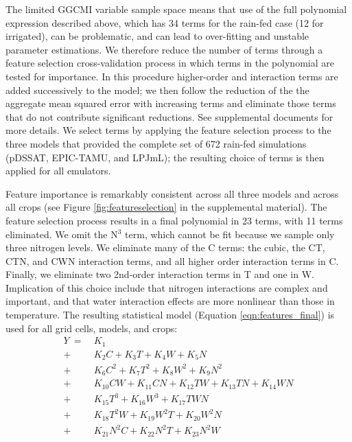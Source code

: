 \documentclass[preprint, 5p, times, twocolumn]{elsarticle}
\begin{document}
The limited GGCMI variable sample space means that use of the full polynomial expression described above, which has 34 terms for the rain-fed case (12 for irrigated), can be problematic, and can lead to over-fitting and unstable parameter estimations. We therefore reduce the number of terms through a feature selection cross-validation process in which terms in the polynomial are tested for importance. In this procedure higher-order and interaction terms are added successively to the model; we then follow the reduction of the the aggregate mean squared error with increasing terms and eliminate those terms that do not contribute significant reductions. See supplemental documents for more details. We select terms by applying the feature selection process to the three models that provided the complete set of 672 rain-fed simulations (pDSSAT, EPIC-TAMU, and LPJmL); the resulting choice of terms is then applied for all emulators. 

Feature importance is remarkably consistent across all three models and across all crops (see Figure \ref{fig:featureselection} in the supplemental material). The feature selection process results in a final polynomial in 23 terms, with 11 terms eliminated. We omit the N$^3$ term, which cannot be fit because we sample only three nitrogen levels. We eliminate many of the C terms: the cubic, the CT, CTN, and CWN interaction terms, and all higher order interaction terms in C.  Finally, we eliminate two 2nd-order interaction terms in T and one in W. Implication of this choice include that nitrogen interactions are complex and important, and that water interaction effects are more nonlinear than those in temperature. The resulting statistical model (Equation \ref{eqn:features_final}) is used for all grid cells, models, and crops: 
\begin{align}
    \label{eqn:features_final}
    Y\ = \ & K_{1}  \\
     + \ & K_{2} C + K_{3}T + K_{4} W + K_{5} N \nonumber \\
                  + \  & K_{6} C^2 + K_{7} T^2 + K_{8} W^2 + K_{9} N^2 \nonumber \\
                  + \ & K_{10} C W + K_{11} C N + K_{12} T W + K_{13} T N + K_{14} W N \nonumber \\ %
                 + \  & K_{15} T^3 + K_{16} W^3 + K_{17} T W N \nonumber \\ %
                 + \ & K_{18} T^{2} W + K_{19} W^2  T + K_{20} W^2 N \nonumber \\
          + \ &  K_{21} N^2 C + K_{22} N^2  T + K_{23} N^2 W \nonumber
\end{align}
\end{document}
